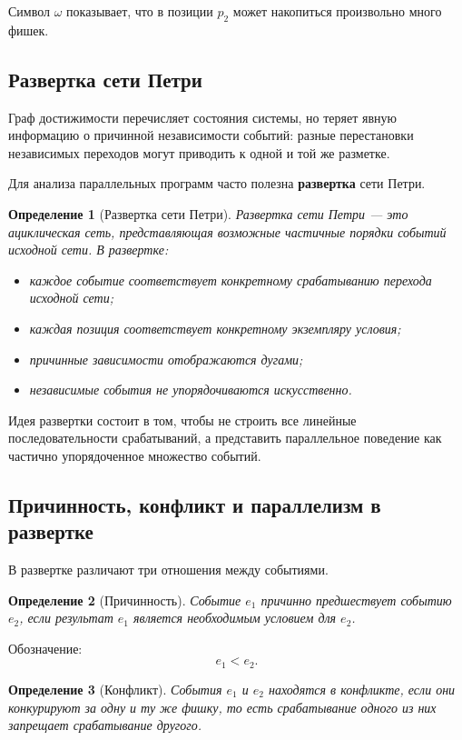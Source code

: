 \documentclass[12pt,a4paper]{article}
\newtheorem{definition}{Определение}
\begin{document}
Символ $\omega$ показывает, что в позиции $p_2$ может накопиться произвольно много фишек.

\subsection{Развертка сети Петри}

Граф достижимости перечисляет состояния системы, но теряет явную информацию о причинной независимости событий: разные перестановки независимых переходов могут приводить к одной и той же разметке.

Для анализа параллельных программ часто полезна \textbf{развертка} сети Петри.

\begin{definition}[Развертка сети Петри]
Развертка сети Петри --- это ациклическая сеть, представляющая возможные частичные порядки событий исходной сети. В развертке:
\begin{itemize}
    \item каждое событие соответствует конкретному срабатыванию перехода исходной сети;
    \item каждая позиция соответствует конкретному экземпляру условия;
    \item причинные зависимости отображаются дугами;
    \item независимые события не упорядочиваются искусственно.
\end{itemize}
\end{definition}

Идея развертки состоит в том, чтобы не строить все линейные последовательности срабатываний, а представить параллельное поведение как частично упорядоченное множество событий.

\subsection{Причинность, конфликт и параллелизм в развертке}

В развертке различают три отношения между событиями.

\begin{definition}[Причинность]
Событие $e_1$ причинно предшествует событию $e_2$, если результат $e_1$ является необходимым условием для $e_2$.
\end{definition}

Обозначение:
\[
e_1 < e_2.
\]

\begin{definition}[Конфликт]
События $e_1$ и $e_2$ находятся в конфликте, если они конкурируют за одну и ту же фишку, то есть срабатывание одного из них запрещает срабатывание другого.
\end{definition}
\end{document}

